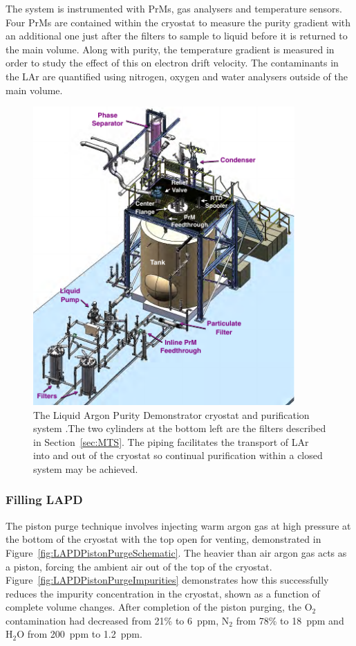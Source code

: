 The system is instrumented with PrMs, gas analysers and temperature sensors.  Four PrMs are contained within the cryostat to measure the purity gradient with an additional one just after the filters to sample to liquid before it is returned to the main volume.  Along with purity, the temperature gradient is measured in order to study the effect of this on electron drift velocity.  The contaminants in the LAr are quantified using nitrogen, oxygen and water analysers outside of the main volume.

\begin{figure}
  \centering
  \includegraphics[width=10cm]{LAPD.pdf}
  \caption[The Liquid Argon Purity Demonstrator cryostat and purification system.]{The Liquid Argon Purity Demonstrator cryostat and purification system \cite{LAPDJINST2014}.The two cylinders at the bottom left are the filters described in Section~\ref{sec:MTS}.  The piping facilitates the transport of LAr into and out of the cryostat so continual purification within a closed system may be achieved.}
  \label{fig:LAPD}
\end{figure}

\subsubsection{Filling LAPD}\label{sec:FillingLAPD}

The piston purge technique involves injecting warm argon gas at high pressure at the bottom of the cryostat with the top open for venting, demonstrated in Figure~\ref{fig:LAPDPistonPurgeSchematic}.  The heavier than air argon gas acts as a piston, forcing the ambient air out of the top of the cryostat.  Figure~\ref{fig:LAPDPistonPurgeImpurities} demonstrates how this successfully reduces the impurity concentration in the cryostat, shown as a function of complete volume changes.  After completion of the piston purging, the O$_2$ contamination had decreased from 21\% to 6~ppm, N$_2$ from 78\% to 18~ppm and H$_2$O from 200~ppm to 1.2~ppm.

